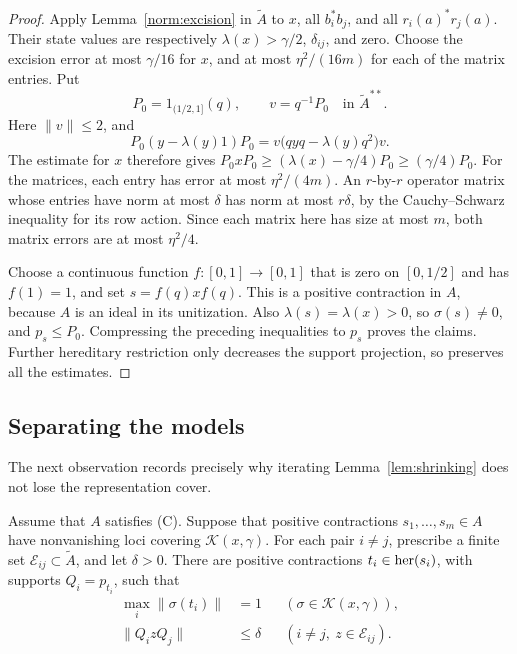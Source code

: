 \begin{proof}
Apply Lemma~\ref{norm:excision} in \(\widetilde A\) to \(x\), all
\(b_i^*b_j\), and all \(r_i(a)^*r_j(a)\).  Their state values are
respectively \(\lambda(x)>\gamma/2\), \(\delta_{ij}\), and zero.
Choose the excision error at most \(\gamma/16\) for \(x\), and at
most \(\eta^2/(16m)\) for each of the matrix entries.
Put
\[
 P_0=1_{(1/2,1]}(q),\qquad v=q^{-1}P_0
 \quad\text{in }\widetilde A^{**}.
\]
Here \(\|v\|\le2\), and
\[
 P_0(y-\lambda(y)1)P_0
       =v\big(qyq-\lambda(y)q^2\big)v.
\]
The estimate for \(x\) therefore gives
\(P_0xP_0\ge(\lambda(x)-\gamma/4)P_0\ge(\gamma/4)P_0\).
For the matrices, each entry has error at most
\(\eta^2/(4m)\).  An \(r\)-by-\(r\) operator matrix whose entries
have norm at most \(\delta\) has norm at most \(r\delta\), by the
Cauchy--Schwarz inequality for its row action.  Since each matrix
here has size at most \(m\), both matrix errors are at most
\(\eta^2/4\).

Choose a continuous function \(f:[0,1]\to[0,1]\) that is zero on
\([0,1/2]\) and has \(f(1)=1\), and set
\(s=f(q)xf(q)\).  This is a positive contraction in \(A\), because
\(A\) is an ideal in its unitization.  Also
\(\lambda(s)=\lambda(x)>0\), so \(\sigma(s)\ne0\), and \(p_s\le P_0\).
Compressing the preceding inequalities to \(p_s\) proves the
claims.  Further hereditary restriction only decreases the support
projection, so preserves all the estimates.
\end{proof}

\subsection{Separating the models}

The next observation records precisely why iterating
Lemma~\ref{lem:shrinking} does not lose the representation cover.

\begin{lemma}\label{norm:separated-cover}
Assume that $A$ satisfies \textup{(C)}. Suppose that positive
contractions \(s_1,\ldots,s_m\in A\) have
nonvanishing loci covering \(\mathcal K(x,\gamma)\).
For each pair \(i\ne j\), prescribe a finite set
\(\mathcal E_{ij}\subset\widetilde A\), and let \(\delta>0\).
There are positive contractions \(t_i\in\operatorname{her}(s_i)\), with supports
\(Q_i=p_{t_i}\), such that
\begin{align}
 \max_i\|\sigma(t_i)\|&=1
                 &&(\sigma\in\mathcal K(x,\gamma)),       \label{norm:retained-cover}\\
 \|Q_i z Q_j\|&\le\delta
                 &&(i\ne j,\ z\in\mathcal E_{ij}).        \label{norm:cross-compressions}
\end{align}
\end{lemma}

